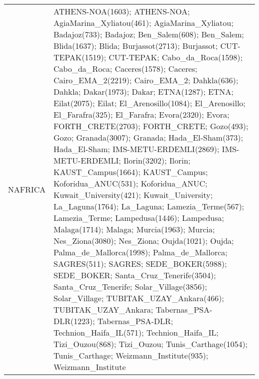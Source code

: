 \documentclass[journal abbreviation, manuscript]{copernicus}
\begin{document}
\begin{table}
\begin{tabularx}{\textwidth}{lX}
                                                                                                                                                                                                                                                                                                                                                                                                                                                      \\
  NAFRICA   & ATHENS-NOA(1603); ATHENS-NOA; AgiaMarina\_Xyliatou(461); AgiaMarina\_Xyliatou; Badajoz(733); Badajoz; Ben\_Salem(608); Ben\_Salem; Blida(1637); Blida; Burjassot(2713); Burjassot; CUT-TEPAK(1519); CUT-TEPAK; Cabo\_da\_Roca(1598); Cabo\_da\_Roca; Caceres(1578); Caceres; Cairo\_EMA\_2(2219); Cairo\_EMA\_2; Dahkla(636); Dahkla; Dakar(1973); Dakar; ETNA(1287); ETNA; Eilat(2075); Eilat; El\_Arenosillo(1084); El\_Arenosillo; El\_Farafra(325); El\_Farafra; Evora(2320); Evora; FORTH\_CRETE(2703); FORTH\_CRETE; Gozo(493); Gozo; Granada(3007); Granada; Hada\_El-Sham(373); Hada\_El-Sham; IMS-METU-ERDEMLI(2869); IMS-METU-ERDEMLI; Ilorin(3202); Ilorin; KAUST\_Campus(1664); KAUST\_Campus; Koforidua\_ANUC(531); Koforidua\_ANUC; Kuwait\_University(421); Kuwait\_University; La\_Laguna(1764); La\_Laguna; Lamezia\_Terme(567); Lamezia\_Terme; Lampedusa(1446); Lampedusa; Malaga(1714); Malaga; Murcia(1963); Murcia; Nes\_Ziona(3080); Nes\_Ziona; Oujda(1021); Oujda; Palma\_de\_Mallorca(1998); Palma\_de\_Mallorca; SAGRES(511); SAGRES; SEDE\_BOKER(5988); SEDE\_BOKER; Santa\_Cruz\_Tenerife(3504); Santa\_Cruz\_Tenerife; Solar\_Village(3856); Solar\_Village; TUBITAK\_UZAY\_Ankara(466); TUBITAK\_UZAY\_Ankara; Tabernas\_PSA-DLR(1223); Tabernas\_PSA-DLR; Technion\_Haifa\_IL(571); Technion\_Haifa\_IL; Tizi\_Ouzou(868); Tizi\_Ouzou; Tunis\_Carthage(1054); Tunis\_Carthage; Weizmann\_Institute(935); Weizmann\_Institute                                                                                                                                                                                                                                                                                                                                                                                                                                                                                                                                                                                                                                                                                                                                                                                                                                                                                                                                                                                                                                                                                                                                                                                                                                                                                                                                                                                                                     
\end{tabularx}
\end{table}
\end{document}
